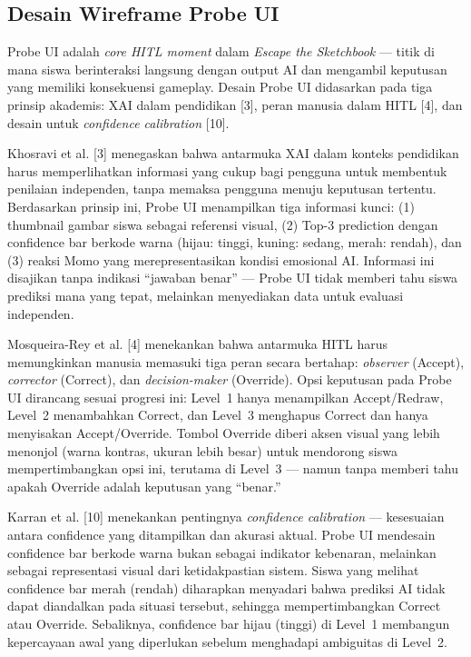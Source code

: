 \documentclass[10pt,twoside,openright]{report}
\begin{document}
\subsection{Desain Wireframe Probe UI}
\label{subsec:wireframe-probe-ui}

Probe UI adalah \textit{core HITL moment} dalam \textit{Escape the Sketchbook} --- titik di mana siswa berinteraksi langsung dengan output AI dan mengambil keputusan yang memiliki konsekuensi gameplay. Desain Probe UI didasarkan pada tiga prinsip akademis: XAI dalam pendidikan [3], peran manusia dalam HITL [4], dan desain untuk \textit{confidence calibration} [10].

Khosravi et al. [3] menegaskan bahwa antarmuka XAI dalam konteks pendidikan harus memperlihatkan informasi yang cukup bagi pengguna untuk membentuk penilaian independen, tanpa memaksa pengguna menuju keputusan tertentu. Berdasarkan prinsip ini, Probe UI menampilkan tiga informasi kunci: (1) thumbnail gambar siswa sebagai referensi visual, (2) Top-3 prediction dengan confidence bar berkode warna (hijau: tinggi, kuning: sedang, merah: rendah), dan (3) reaksi Momo yang merepresentasikan kondisi emosional AI. Informasi ini disajikan tanpa indikasi ``jawaban benar'' --- Probe UI tidak memberi tahu siswa prediksi mana yang tepat, melainkan menyediakan data untuk evaluasi independen.

Mosqueira-Rey et al. [4] menekankan bahwa antarmuka HITL harus memungkinkan manusia memasuki tiga peran secara bertahap: \textit{observer} (Accept), \textit{corrector} (Correct), dan \textit{decision-maker} (Override). Opsi keputusan pada Probe UI dirancang sesuai progresi ini: Level~1 hanya menampilkan Accept/Redraw, Level~2 menambahkan Correct, dan Level~3 menghapus Correct dan hanya menyisakan Accept/Override. Tombol Override diberi aksen visual yang lebih menonjol (warna kontras, ukuran lebih besar) untuk mendorong siswa mempertimbangkan opsi ini, terutama di Level~3 --- namun tanpa memberi tahu apakah Override adalah keputusan yang ``benar.''

Karran et al. [10] menekankan pentingnya \textit{confidence calibration} --- kesesuaian antara confidence yang ditampilkan dan akurasi aktual. Probe UI mendesain confidence bar berkode warna bukan sebagai indikator kebenaran, melainkan sebagai representasi visual dari ketidakpastian sistem. Siswa yang melihat confidence bar merah (rendah) diharapkan menyadari bahwa prediksi AI tidak dapat diandalkan pada situasi tersebut, sehingga mempertimbangkan Correct atau Override. Sebaliknya, confidence bar hijau (tinggi) di Level~1 membangun kepercayaan awal yang diperlukan sebelum menghadapi ambiguitas di Level~2.
\end{document}
